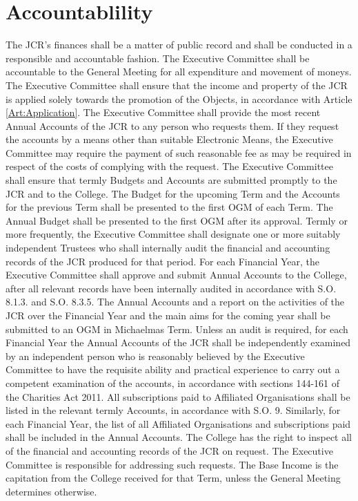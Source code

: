 \section{Accountablility}
\npara The JCR's finances shall be a matter of public record and shall be conducted in a responsible and accountable fashion.  The Executive Committee shall be accountable to the General Meeting for all expenditure and movement of moneys.
\npara The Executive Committee shall ensure that the income and property of the JCR is applied solely towards the promotion of the Objects, in accordance with Article \ref{Art:Application}.
\npara The Executive Committee shall provide the most recent Annual Accounts of the JCR to any person who requests them.  If they request the accounts by a means other than suitable Electronic Means, the Executive Committee may require the payment of such reasonable fee as may be required in respect of the costs of complying with the request.
\npara The Executive Committee shall ensure that termly Budgets and Accounts are submitted promptly to the JCR and to the College. The Budget for the upcoming Term and the Accounts for the previous Term shall be presented to the first OGM of each Term.  The Annual Budget shall be presented to the first OGM after its approval.
\npara Termly or more frequently, the Executive Committee shall designate one or more suitably independent Trustees who shall internally audit the financial and accounting records of the JCR produced for that period.
\npara For each Financial Year, the Executive Committee shall approve and submit Annual Accounts to the College, after all relevant records have been internally audited in accordance with S.O. 8.1.3. and S.O. 8.3.5.  The Annual Accounts and a report on the activities of the JCR over the Financial Year and the main aims for the coming year shall be submitted to an OGM in Michaelmas Term.
\npara Unless an audit is required, for each Financial Year the Annual Accounts of the JCR shall be independently examined by an independent person who is reasonably believed by the Executive Committee to have the requisite ability and practical experience to carry out a competent examination of the accounts, in accordance with sections 144-161 of the Charities Act 2011.
\npara All subscriptions paid to Affiliated Organisations shall be listed in the relevant termly Accounts, in accordance with S.O. 9.  Similarly, for each Financial Year, the list of all Affiliated Organisations and subscriptions paid shall be included in the Annual Accounts.
\npara The College has the right to inspect all of the financial and accounting records of the JCR on request. The Executive Committee is responsible for addressing such requests.
\npara The Base Income is the capitation from the College received for that Term, unless the General Meeting determines otherwise.

